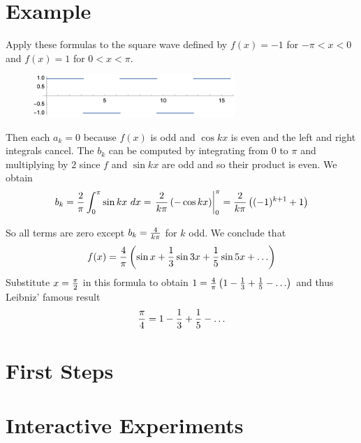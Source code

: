 \documentclass[11pt, oneside]{article}   	%
\begin{document}
\section{Example}

Apply these formulas to the square wave defined by $f(x) = -1$ for $- \pi < x < 0$ and $f(x) = 1$ for $0 < x < \pi$.

\begin{figure}[H] %
   \centering
   \includegraphics[width=3in]{Graphics/squarewave}
\end{figure}



Then each $a_k = 0$ because $f(x)$ is odd and $\cos kx$ is even and the left and right integrals cancel.
The $b_k$ can be computed by integrating from $0$ to $\pi$ and multiplying by $2$ since $f$ and $\sin kx$ are odd and so their product is even. We obtain
\[b_k = {2 \over \pi} \int_0^\pi  \sin kx \ dx = \left. {2 \over {k \pi}} \left(- \cos kx\right) \right|_0^\pi = {2 \over {k \pi}} \left( (-1)^{k + 1} + 1 \right)\]

So all terms are zero except $b_k = {4 \over {k \pi}}$ for $k$ odd. We conclude that
\[f(x) = {4 \over \pi} \left(\sin x + {1 \over 3} \sin 3x + {1 \over 5} \sin 5x + \ldots\right)\]
Substitute $x = {\pi \over 2}$ in this formula to obtain
$1 = {4 \over \pi} \left(1 - {1 \over 3} + {1 \over 5} - \ldots\right)$ and thus Leibniz' famous result
\[{\pi \over 4} = 1 - {1 \over 3} + {1 \over 5} - \ldots\]
 

\ifx\HCode\undefined
\section{First Steps}

\else
\section{Interactive Experiments}
\end{document}
